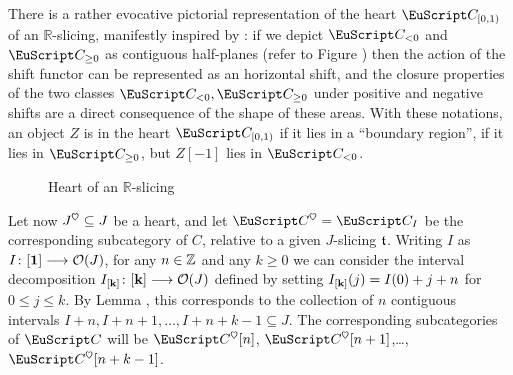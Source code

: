 \begin{remark}\label{evocative}
There is a rather evocative pictorial representation of the heart $\C_{[0,1)}$ of an $\mathbb{R}$-slicing, manifestly inspired by \cite{Brid}: if we depict $\C_{<0}$ and $\C_{\geq 0}$ as contiguous half-planes (refer to Figure )
then the action of the shift functor can be represented as an horizontal shift, and the closure properties of the two classes $\C_{<0}, \C_{\geq 0}$ under positive and negative shifts are a direct consequence of the shape of these areas. With these notations, an object $Z$ is in the heart $\C_{[0,1)}$ if it lies in a ``boundary region'', \ie if it lies in $\C_{\geq 0}$, but $Z[-1]$ lies in $\C_{<0}$.
\begin{center}
\begin{figure}[h]
\caption{Heart of an $\mathbb{R}$-slicing}
\label{figure:slices}
\end{figure}
\end{center}
\end{remark}


Let now $J^\heart\subseteq J$ be a heart, and let $\C^\heart=\C_I$ be the corresponding subcategory of $C$, relative to a given $J$-slicing $\mathfrak{t}$. Writing $I$ as $I\colon [\mathbf{1}] \longrightarrow \mathcal{O}(J)$, for any $n\in \mathbb{Z}$ and any $k\geq 0$ we can consider the interval decomposition $I_{[\mathbf{k}]}\colon [\mathbf{k}]\longrightarrow \mathcal{O}(J)$ defined by setting $I_{[\mathbf{k}]}(j)=I(0)+j+n$ for $0\leq j\leq k$. By Lemma , this corresponds to the collection of $n$ contiguous intervals $I+n,I+n+1,\dots,I+n+k-1\subseteq J$. The corresponding subcategories of $\C$ will be $\C^\heart[n]$, $\C^\heart[n+1]$,\dots,$\C^\heart[n+k-1]$.




